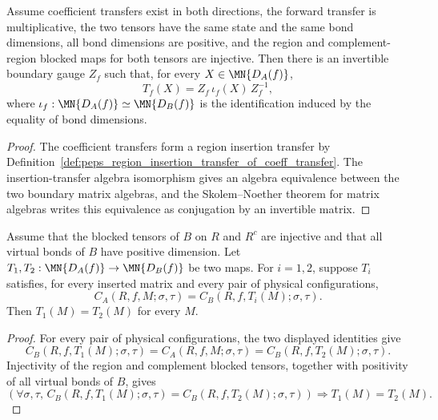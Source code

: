 \begin{theorem}
    \label{thm:peps_region_edge_gauge_of_coeff_transfer}
    \leanok
    Assume coefficient transfers exist in both directions, the forward transfer
    is multiplicative, the two tensors have the same state and the same bond
    dimensions, all bond dimensions are positive, and the region and
    complement-region blocked maps for both tensors are injective.  Then there
    is an invertible boundary gauge $Z_f$ such that, for every
    $X\in\MN{D_A(f)}$,
    \[
        T_f(X)=Z_f\,\iota_f(X)\,Z_f^{-1},
    \]
    where $\iota_f:\MN{D_A(f)}\simeq\MN{D_B(f)}$ is the identification induced by
    the equality of bond dimensions.
\end{theorem}
\begin{proof}\leanok
    The coefficient transfers form a region insertion transfer by
    Definition~\ref{def:peps_region_insertion_transfer_of_coeff_transfer}.  The
    insertion-transfer algebra isomorphism gives an algebra equivalence between
    the two boundary matrix algebras, and the Skolem--Noether theorem for matrix
    algebras writes this equivalence as conjugation by an invertible matrix.
\end{proof}

\begin{theorem}
    \label{thm:peps_regionInsertedCoeff_transferMap_unique}
    \leanok
    Assume that the blocked tensors of \(B\) on \(R\) and \(R^c\) are injective
    and that all virtual bonds of \(B\) have positive dimension.  Let
    \(T_1,T_2:\MN{D_A(f)}\to\MN{D_B(f)}\) be two maps.  For \(i=1,2\), suppose
    \(T_i\) satisfies, for every inserted matrix and every pair of physical
    configurations,
    \[
        C_A(R,f,M;\sigma,\tau)
        =
        C_B(R,f,T_i(M);\sigma,\tau).
    \]
    Then \(T_1(M)=T_2(M)\) for every \(M\).
\end{theorem}
\begin{proof}\leanok
    For every pair of physical configurations, the two displayed identities give
    \[
        C_B(R,f,T_1(M);\sigma,\tau)
        =
        C_A(R,f,M;\sigma,\tau)
        =
        C_B(R,f,T_2(M);\sigma,\tau).
    \]
    Injectivity of the region and complement blocked tensors, together with
    positivity of all virtual bonds of \(B\), gives
    \[
        \left(
        \forall\sigma,\tau,\,
        C_B(R,f,T_1(M);\sigma,\tau)
        =
        C_B(R,f,T_2(M);\sigma,\tau)
        \right)
        \Longrightarrow
        T_1(M)=T_2(M).
    \]
\end{proof}

